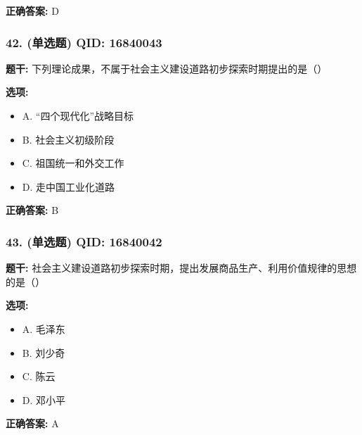 \documentclass[12pt,UTF8]{ctexart}
\begin{document}
\textbf{正确答案:}
D

\vspace{0.3em}\hrulefill\vspace{0.7em}

\subsubsection*{42. (单选题) \small QID: 16840043}

\textbf{题干:}
下列理论成果，不属于社会主义建设道路初步探索时期提出的是（）

\textbf{选项:}
\begin{itemize}[leftmargin=*]

  \item A. “四个现代化”战略目标

  \item B. 社会主义初级阶段

  \item C. 祖国统一和外交工作

  \item D. 走中国工业化道路

\end{itemize}

\textbf{正确答案:}
B

\vspace{0.3em}\hrulefill\vspace{0.7em}

\subsubsection*{43. (单选题) \small QID: 16840042}

\textbf{题干:}
社会主义建设道路初步探索时期，提出发展商品生产、利用价值规律的思想的是（）

\textbf{选项:}
\begin{itemize}[leftmargin=*]

  \item A. 毛泽东

  \item B. 刘少奇

  \item C. 陈云

  \item D. 邓小平

\end{itemize}

\textbf{正确答案:}
A

\vspace{0.3em}\hrulefill\vspace{0.7em}
\end{document}
